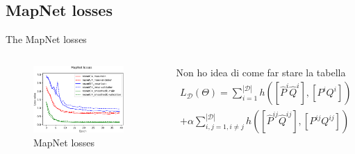 \documentclass[
    center,
]{beamer}
\begin{document}
\subsection{MapNet losses}
\begin{frame}{The MapNet losses}
    \begin{columns}
    \begin{figure}
        \centering
        \includegraphics[width=0.9\textwidth]{../imgs/mapnet_losses.png}
        \caption{MapNet losses}
    \end{figure}
    Non ho idea di come far stare la tabella
    \begin{multline}
    L_\mathcal{D}(\Theta) = \sum\limits_{i=1}^{|\mathcal{D}|} h([\hat{P}^i \hat{Q}^i], [P^i Q^i]) \\
    + \alpha\sum\limits_{i,j=1, i\neq j}^{|\mathcal{D}|} h([\hat{P}^{ij} \hat{Q}^{ij}], [P^{ij} Q^{ij}])
    \end{multline}
    \end{columns}
\end{frame}
\end{document}
